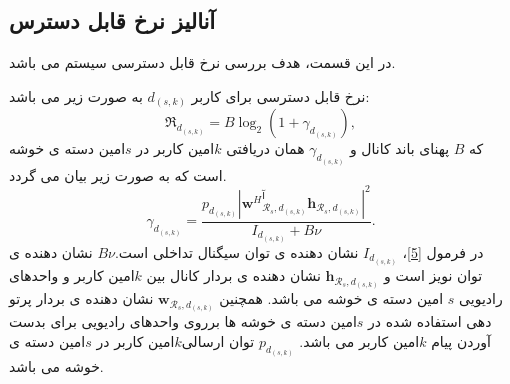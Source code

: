  \subsection{آنالیز نرخ قابل دسترس}
در این قسمت، هدف بررسی نرخ قابل دسترسی سیستم می باشد.
\begin{theorem}\label{t1}
 نرخ قابل دسترسی برای کاربر $d_{(s,k)}$ به صورت زیر می باشد:
\begin{equation}\label{e1}
\mathfrak{R}_{d_{(s,k)}} = B \log_2(1+\gamma_{d_{(s,k)}}),
\end{equation}
که $B$ پهنای باند کانال و $\gamma_{d_{(s,k)}}$ همان  دریافتی $k$امین کاربر در $s$امین دسته ی خوشه است که به صورت زیر بیان می گردد.  
\begin{equation}\label{5}
\gamma_{d_{(s,k)}}= \frac{p_{d_{(s,k)}} |{\boldsymbol{w}^H}_{\mathcal{R}_{s},d_{(s,k)}}^آ\boldsymbol{h}_{\mathcal{R}_s, d_{(s,k)}}|^2}{I_{d_{(s,k)}}+B\nu}.
\end{equation}
در فرمول \eqref{5}، 
$I_{d_{(s,k)}}$
نشان دهنده ی توان سیگنال تداخلی است.$B\nu$
نشان دهنده ی توان نویز است و
$\boldsymbol{h}_{\mathcal{R}_s, d_{(s,k)}}$ 
 نشان دهنده ی بردار کانال بین $k$امین کاربر و واحدهای رادیویی
 $s$
 امین دسته ی خوشه می باشد. همچنین 
 $\boldsymbol{w}_{\mathcal{R}_{s},d_{(s,k)}}$
 نشان دهنده ی بردار پرتو دهی استفاده شده در $s$امین دسته ی خوشه ها برروی واحدهای رادیویی برای بدست آوردن پیام $k$امین کاربر می باشد. 
 $p_{d_{(s,k)}}$
 توان ارسالی$k$امین کاربر در $s$امین دسته ی خوشه می باشد.
\end{theorem}
